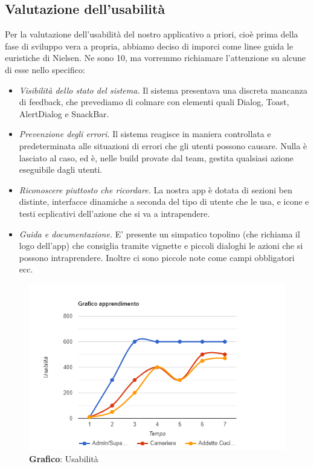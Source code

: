 \subsection{Valutazione dell'usabilità}

    \begin{flushleft}
       Per la valutazione dell'usabilità del nostro applicativo a priori, cioè prima della fase di sviluppo vera a propria,
       abbiamo deciso di imporci come linee guida le euristiche di Nielsen.
       Ne sono 10, ma vorremmo richiamare l'attenzione su alcune di esse nello specifico:
        \begin{itemize}
            \item \textit{Visibilità dello stato del sistema.} Il sistema presentava una discreta mancanza di feedback, che prevediamo di colmare con elementi quali Dialog, Toast, AlertDialog e SnackBar.
            \item \textit{Prevenzione degli errori.} Il sistema reagisce in maniera controllata e predeterminata alle situazioni di errori che gli utenti possono causare. Nulla è lasciato al caso, ed è, nelle build provate dal team, gestita qualsiasi azione eseguibile dagli utenti.
            \item \textit{Riconoscere piuttosto che ricordare.} La nostra app è dotata di sezioni ben distinte, interfacce dinamiche a seconda del tipo di utente che le usa, e icone e testi ecplicativi dell'azione che si va a intrapendere.
            \item \textit{Guida e documentazione.} E' presente un simpatico topolino (che richiama il logo dell'app) che consiglia tramite vignette e piccoli dialoghi le azioni che si possono intraprendere. Inoltre ci sono piccole note come campi obbligatori ecc.
        \end{itemize}
    \end{flushleft}

    \begin{figure}[H]
        \centering
        \includegraphics[scale=0.6]{assets/immagini varie/grafico usabilita.png}
        \caption{\textbf{Grafico}: Usabilità}\label{fig:Usabilità_graph}
    \end{figure}